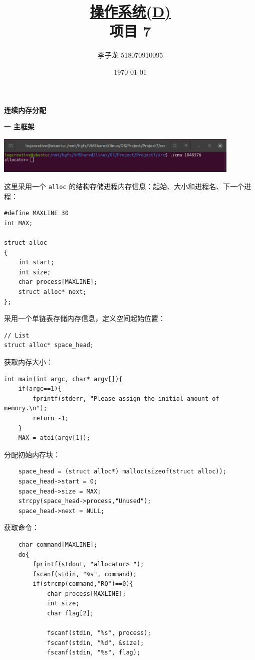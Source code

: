 \documentclass[12pt,a4paper]{article}
\newenvironment{problems}{\begin{list}{}{\renewcommand{\makelabel}[1]{\textbf{##1}\hfil}}}{\end{list}}
\begin{document}
\title{\normalsize \underline{操作系统(D)}\\\LARGE 项目 7}
\author{李子龙 518070910095}
\date{\today}
\maketitle

\textbf{连续内存分配}
\begin{problems}
    \item[一] \textbf{主框架}
    
    \includegraphics[width=0.88\textwidth]{input.png}

    这里采用一个 \texttt{alloc} 的结构存储进程内存信息：起始、大小和进程名、下一个进程：
    \begin{lstlisting}
#define MAXLINE 30
int MAX;

struct alloc
{
    int start;
    int size;
    char process[MAXLINE];
    struct alloc* next;
};
    \end{lstlisting}
    采用一个单链表存储内存信息，定义空间起始位置：
    \begin{lstlisting}
// List
struct alloc* space_head;
    \end{lstlisting}
    
    获取内存大小：
    \begin{lstlisting}
int main(int argc, char* argv[]){
    if(argc==1){
        fprintf(stderr, "Please assign the initial amount of memory.\n");
        return -1;
    }
    MAX = atoi(argv[1]);
    \end{lstlisting}

    分配初始内存块：
    \begin{lstlisting}
    space_head = (struct alloc*) malloc(sizeof(struct alloc));
    space_head->start = 0;
    space_head->size = MAX;
    strcpy(space_head->process,"Unused");
    space_head->next = NULL;
    \end{lstlisting}

    获取命令：
    \begin{lstlisting}
    char command[MAXLINE];
    do{
        fprintf(stdout, "allocator> ");
        fscanf(stdin, "%s", command);
        if(strcmp(command,"RQ")==0){
            char process[MAXLINE];
            int size;
            char flag[2];

            fscanf(stdin, "%s", process);
            fscanf(stdin, "%d", &size);
            fscanf(stdin, "%s", flag);


\end{lstlisting}
\end{problems}
\end{document}
